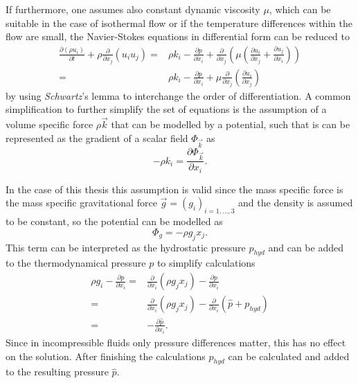       If furthermore, one assumes also constant dynamic viscosity \(\mu\), which can be suitable in the case of isothermal flow or if the temperature differences within the flow are small, the Navier-Stokes equations in differential form can be reduced to 
      \begin{subequations}
        \label{eq:navierstokes}
      \begin{align}
        \frac{\partial \left(\rho u_i \right)}{\partial t} 
        + \rho \frac{\partial}{\partial x_j} \left( u_i  u_j \right) 
        =& \rho k_i
        - \frac{\partial p}{\partial x_i}
      + \frac{\partial}{\partial x_j} \left( \mu  \left( \frac{\partial u_i}{\partial x_j} 
      + \frac{\partial u_j}{\partial x_i} \right) \right) \\[0.5em]
        =& \rho k_i
        - \frac{\partial p}{\partial x_i}
        + \mu \frac{\partial}{\partial x_j} \left( \frac{\partial u_i}{\partial x_j} \right)
      \end{align}
    \end{subequations}
      by using \emph{Schwartz}'s lemma to interchange the order of differentiation. A common simplification to further simplify the set of equations is the assumption of a volume specific force \(\rho \vec{k}\) that can be modelled by a potential, such that is can be represented as the gradient of a scalar field \(\Phi_\vec{k}\) as
      \begin{displaymath}
       - \rho k_i = \frac{\partial \Phi_\vec{k}}{\partial x_i}.
      \end{displaymath}

      In the case of this thesis this assumption is valid since the mass specific force is the mass specific gravitational force \(\vec{g} = \left( g_i \right)_{i = 1,\dots,3}\) and the density is assumed to be constant, so the potential can be modelled as
      \begin{displaymath}
        \Phi_g = - \rho g_j x_j.
      \end{displaymath}
      This term can be interpreted as the hydrostatic pressure \(p_{hyd}\) and can be added to the thermodynamical pressure \(p\) to simplify calculations 
      \begin{align}
        \rho g_i - \frac{\partial p}{\partial x_i} 
        =& \frac{\partial}{\partial x_i} \left( \rho g_j x_j \right) - \frac{\partial p}{\partial x_i} \nonumber \\[0.5em]
        =& \frac{\partial}{\partial x_i} \left( \rho g_j x_j \right) - \frac{\partial}{\partial x_i}  \left(\hat{p} + p_{hyd} \right) \nonumber \\[0.5em]
        =& - \frac{\partial \hat{p}}{\partial x_i}.
      \end{align}
      Since in incompressible fluids only pressure differences matter, this has no effect on the solution. After finishing the calculations \(p_{hyd}\) can be calculated and added to the resulting pressure \(\hat{p}\).


